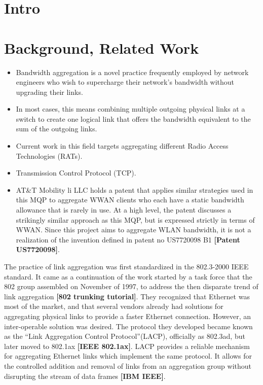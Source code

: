 \documentclass[12pt]{article}
\newcommand{\lcite}[1]
{{\bfseries\color{orange}[#1]}}
\begin{document}
\section{Intro}


\section{Background, Related Work}

	\begin{itemize}
		\item Bandwidth aggregation is a novel practice frequently employed by network engineers who wish to supercharge their network's bandwidth without upgrading their links. 
		\item In most cases, this means combining multiple outgoing physical links at a switch to create one logical link that offers the bandwidth equivalent to the sum of the outgoing links. 
		\item Current work in this field targets aggregating different Radio Access Technologies (RATs).
		\item Transmission Control Protocol (TCP).
		\item AT\&T Mobility li LLC holds a patent that applies similar strategies used in this MQP to aggregate WWAN clients who each have a static bandwidth allowance that is rarely in use. At a high level, the patent discusses a strikingly similar approach as this MQP, but is expressed strictly in terms of WWAN. Since this project aims to aggregate WLAN bandwidth, it is not a realization of the invention defined in patent no US7720098 B1 \lcite{Patent US7720098}.
	\end{itemize}


	The practice of link aggregation was first standardized in the 802.3-2000 IEEE standard. It came as a continuation of the work started by a task force that the 802 group assembled on November of 1997, to address the then disparate trend of link aggregation \lcite{802 trunking tutorial}. They recognized that Ethernet was most of the market, and that several vendors already had solutions for aggregating physical links to provide a faster Ethernet connection. However, an inter-operable solution was desired. The protocol they developed became known as the ``Link Aggregation Control Protocol''(LACP), officially as 802.3ad, but later moved to 802.1ax \lcite{IEEE 802.1ax}. LACP provides a reliable mechanism for aggregating Ethernet links which implement the same protocol. It allows for the controlled addition and removal of links from an aggregation group without disrupting the stream of data frames \lcite{IBM IEEE}.
\end{document}
